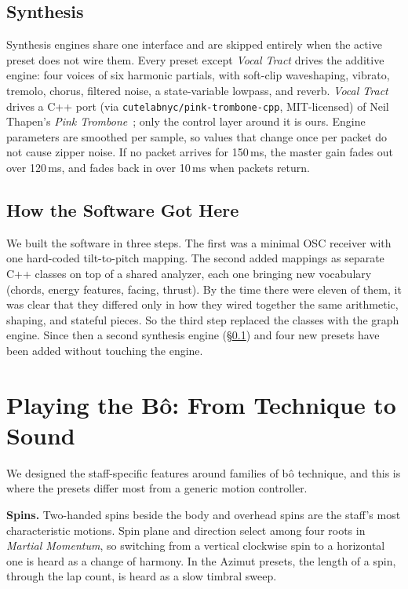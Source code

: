 \documentclass[sigconf,nonacm]{acmart}
\newcommand{\preset}[1]{\textit{#1}}
\begin{document}
\subsection{Synthesis}
\label{sec:synthesis}
Synthesis engines share one interface and are skipped entirely when the active preset does not wire
them. Every preset except \preset{Vocal Tract} drives the additive engine: four voices of six
harmonic partials, with soft-clip waveshaping, vibrato, tremolo, chorus, filtered noise, a
state-variable lowpass, and reverb. \preset{Vocal Tract} drives a C++ port (via
\texttt{cutelabnyc/pink-trombone-cpp}, MIT-licensed) of Neil Thapen's \textit{Pink
Trombone}~\cite{thapen2017pinktrombone}; only the control layer around it is ours. Engine parameters
are smoothed per sample, so values that change once per packet do not cause zipper noise. If no
packet arrives for 150\,ms, the master gain fades out over 120\,ms, and fades back in over 10\,ms when
packets return.

\subsection{How the Software Got Here}
We built the software in three steps. The first was a minimal OSC receiver with one hard-coded
tilt-to-pitch mapping. The second added mappings as separate C++ classes on top of a shared
analyzer, each one bringing new vocabulary (chords, energy features, facing, thrust). By the time
there were eleven of them, it was clear that they differed only in how they wired together the same
arithmetic, shaping, and stateful pieces. So the third step replaced the classes with the graph
engine. Since then a second synthesis engine (\S\ref{sec:synthesis}) and four new presets have been
added without touching the engine.

\section{Playing the B\^o: From Technique to Sound}
\label{sec:technique}
We designed the staff-specific features around families of b\^o technique, and this is where the
presets differ most from a generic motion controller.

\textbf{Spins.} Two-handed spins beside the body and overhead spins are the staff's most
characteristic motions. Spin plane and direction select among four roots in
\preset{Martial Momentum}, so switching from a vertical clockwise spin to a horizontal one is heard
as a change of harmony. In the Azimut presets, the length of a spin, through the lap count, is
heard as a slow timbral sweep.
\end{document}
